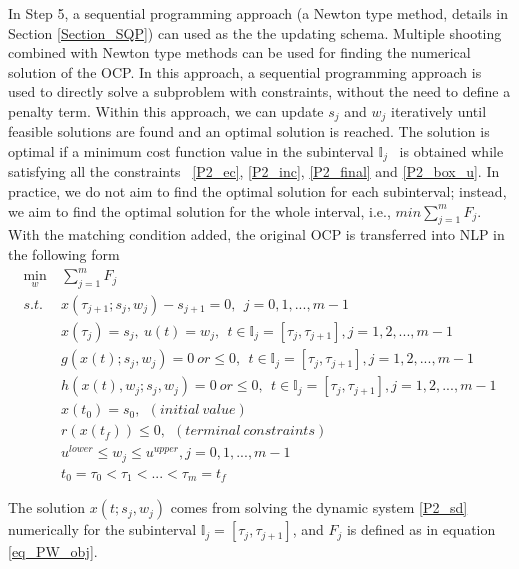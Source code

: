 \documentclass  [
  paper    = a4,
  BCOR     = 10mm,
  twoside,
  fontsize = 12pt,
  fleqn,
  toc      = bibnumbered,
  toc      = listofnumbered,
  numbers  = noendperiod,
  headings = normal,
  listof   = leveldown,
  version  = 3.03
]                                       {scrreprt}
\newcommand{\<}{\langle}
\renewcommand{\>}{\rangle}
\begin{document}
In Step 5, a sequential programming approach (a Newton type method, details in Section \ref{Section_SQP}) can used as the the updating schema. Multiple shooting combined with Newton type methods can be used for finding the numerical solution of the OCP. In this approach, a sequential programming approach is used to directly solve a subproblem with constraints, without the need to define a penalty term. Within this approach, we can update $s_j$ and $w_j$ iteratively until feasible solutions are found and an optimal solution is reached.  The solution is optimal if a minimum cost function value in the subinterval $\mathbb{I}_j$  is obtained while satisfying all the constraints  \ref{P2_ec}, \ref{P2_inc}, \ref{P2_final} and \ref{P2_box_u}. In practice, we do not aim to find the optimal solution for each subinterval; instead, we aim to find the optimal solution for the whole interval, i.e., $min  \sum_{j=1}^{m} F_j $. With the matching condition added, the original OCP is transferred into NLP in the following form
	\begin{subequations}
	\begin{align}
		\underset{w}{\text{min}}   \ &  \sum_{j=1}^{m} F_j   \label{P3_obj}   \\
		s.t. \ \ & x(\tau_{j+1}; s_j, w_j) - s_{j+1} = 0,   \ \  j = 0, 1, ...,m -1 \label{P3_eq}  \\
		& x(\tau_j) = s_j, \  u(t) = w_j, \ \  t \in \mathbb{I}_j =[\tau_j, \tau_{j+1}], j = 1, 2, ... , m-1 \\
		 &  g(x(t); s_j, w_j)  = 0 \  or \leq 0,     \ \  t \in \mathbb{I}_j =[\tau_j, \tau_{j+1}], j = 1, 2, ... , m-1 \\
		 & h(x(t),w_j; s_j, w_j) = 0 \  or \leq 0,    \ \  t \in \mathbb{I}_j =[\tau_j, \tau_{j+1}], j = 1, 2, ... , m-1   \\
    	& x(t_0) = s_0, \ \ (initial \ value) \\
	& r(x(t_f)) \leq 0, \ \ (terminal \ constraints) \\
	& u^{lower} \leq w_j \leq u^{upper} ,   j = 0, 1, ... , m-1 \\ 
		         &   t_0 = \tau_0 < \tau_1 < ... < \tau_m = t_f 
	\end{align}
	\label{P3_MSNLP}
\end{subequations}  

The  solution  $x(t; s_j, w_j)$ comes from solving the dynamic system \ref{P2_sd} numerically for the subinterval  $\mathbb{I}_j =[\tau_j, \tau_{j+1}]$,  and $F_j$ is defined as in equation \ref{eq_PW_obj}.
\end{document}

